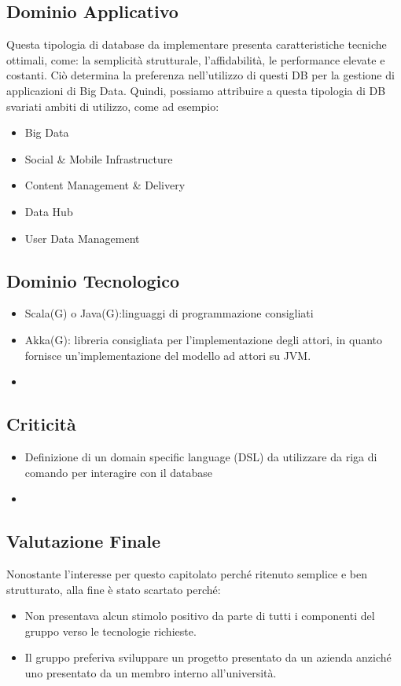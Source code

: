 \subsection{Dominio Applicativo}
Questa tipologia di database da implementare presenta caratteristiche tecniche ottimali, come: la semplicità strutturale, l'affidabilità, le performance elevate e costanti.
Ciò determina la preferenza nell'utilizzo di questi DB per la gestione di applicazioni di Big Data.
Quindi, possiamo attribuire a questa tipologia di DB svariati ambiti di utilizzo, come ad esempio:
\begin{itemize}
\item
Big Data 
\item
Social & Mobile Infrastructure
\item
Content Management & Delivery
\item
Data Hub
\item
User Data Management 
\end{itemize}

\subsection{Dominio Tecnologico}
\begin{itemize}
\item
Scala(G) o Java(G):linguaggi di programmazione consigliati
\item
Akka(G): libreria consigliata per l'implementazione degli attori, in quanto fornisce un'implementazione del modello ad attori su JVM.
\item
\end{itemize}

\subsection{Criticità}
\begin{itemize}
\item
Definizione di un domain specific language (DSL) da utilizzare da riga di comando per interagire con il database
\item
\end{itemize}

\subsection{Valutazione Finale}
Nonostante l'interesse per questo capitolato perché ritenuto semplice e ben strutturato, alla fine è stato scartato perché:
\begin{itemize}
\item
Non presentava alcun stimolo positivo da parte di tutti i componenti del gruppo verso le tecnologie richieste.
\item
Il gruppo preferiva sviluppare un progetto presentato da un azienda anziché uno presentato da un membro interno all'università.
\end{itemize}